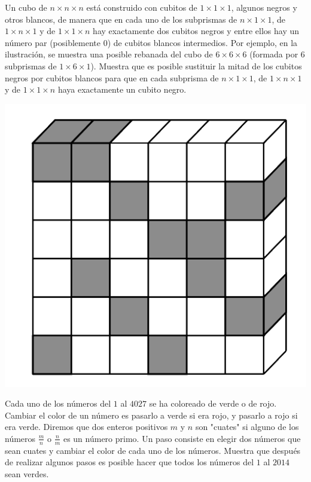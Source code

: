 \documentclass[11pt]{scrartcl}
\begin{document}
\begin{problem}
    [2013/4] 
    Un cubo de $n \times n \times n$ está construido con cubitos de $1 \times 1 \times 1$, algunos negros y otros blancos, de manera que en cada uno de los subprismas de $n\times 1\times 1$, de $1\times n\times 1$ y de $1\times 1\times n$ hay exactamente dos cubitos negros y entre ellos hay un número par (posiblemente $0$) de cubitos blancos intermedios. Por ejemplo, en la ilustración, se muestra una posible rebanada del cubo de $6 \times 6 \times 6$ (formada por $6$ subprismas de $1 \times 6 \times 1$). Muestra que es posible sustituir la mitad de los cubitos negros por cubitos blancos para que en cada subprisma de $n \times 1 \times 1$, de $1 \times n \times 1$ y de $1 \times 1 \times n$ haya exactamente un cubito negro. \\
    \begin{center}
    \includegraphics[scale=0.2]{13OMM4.png}
    \end{center}
\end{problem}
\begin{problem}
    [2014/1]  Cada uno de los números del $1$ al $4027$ se ha coloreado de verde o de rojo. Cambiar el color de un número es pasarlo a verde si era rojo, y pasarlo a rojo si era verde. Diremos que dos enteros positivos $m$ y $n$ son "cuates" si alguno de los números $\frac m n$ o $\frac n m$ es un número primo. Un paso consiste en elegir dos números que sean cuates y cambiar el color de cada uno de los números. Muestra que después de realizar algunos pasos es posible hacer que todos los números del $1$ al $2014$ sean verdes.
\end{problem}
\end{document}

